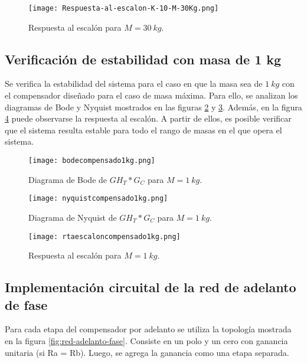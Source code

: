 \begin{figure}[H]
	\centering
	\texttt{[image: Respuesta-al-escalon-K-10-M-30Kg.png]}
	\caption{Respuesta al escalón para $M=30\:kg$.}
	\label{fig:rta-escalon-k-10-m-30}
\end{figure}

\subsection{Verificación de estabilidad con masa de 1 kg}

\noindent Se verifica la estabilidad del sistema  para el caso en que la masa sea de $1\:kg$ con el compensador dise\~{n}ado para el caso de masa m\'{a}xima. Para ello, se analizan los diagramas de Bode y Nyquist mostrados en las figuras \ref{fig:bode-analog-para-M-1Kg} y \ref{fig:nyquist-analog-para-M-1Kg}. Adem\'{a}s, en la figura \ref{fig:respuesta-analog-al-escalon-para-M-1Kg} puede observarse la respuesta al escal\'{o}n. A partir de ellos, es posible verificar que el sistema resulta estable para todo el rango de masas en el que opera el sistema. 


\begin{figure}[H]
	\centering
	\texttt{[image: bodecompensado1kg.png]}
	\caption{Diagrama de Bode de $GH_T*G_C$ para $M=1\:kg$.}
	\label{fig:bode-analog-para-M-1Kg}
\end{figure}

\begin{figure}[H]
	\centering
	\texttt{[image: nyquistcompensado1kg.png]}
	\caption{Diagrama de Nyquist de $GH_T*G_C$ para $M=1\:kg$.}
	\label{fig:nyquist-analog-para-M-1Kg}
\end{figure}

\begin{figure}[H]
	\centering
	\texttt{[image: rtaescaloncompensado1kg.png]}
	\caption{Respuesta al escalón para $M=1\:kg$.}
	\label{fig:respuesta-analog-al-escalon-para-M-1Kg}
\end{figure}

\subsection{Implementación circuital de la red de adelanto de fase}

\noindent Para cada etapa del compensador por adelanto se utiliza la topología mostrada en la figura \ref{fig:red-adelanto-fase}. Consiste en  un polo y un cero con ganancia unitaria (si Ra = Rb). Luego, se agrega la ganancia como una etapa separada.

